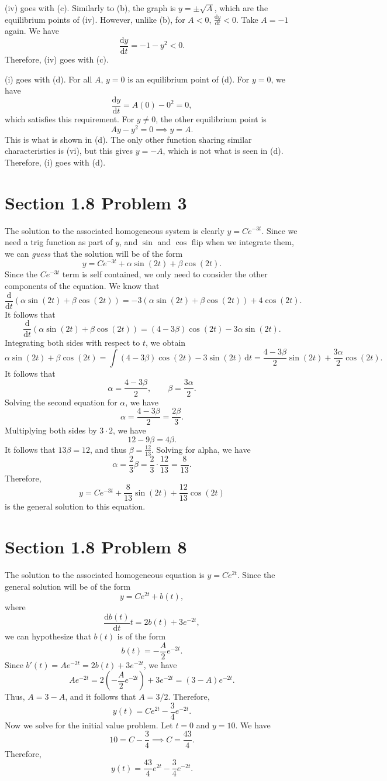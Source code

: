 \documentclass[11pt, letterpaper]{report}
\begin{document}
(iv) goes with (c). Similarly to (b), the graph is $y=\pm \sqrt{A} $, which are the equilibrium points of (iv). However, unlike (b), for $A<0$, $\frac{\mathrm{d}y}{\mathrm{d}t} <0$. Take $A=-1$ again. We have
\[
	\frac{\mathrm{d}y}{\mathrm{d}t} =-1-y^2<0
.\]
Therefore, (iv) goes with (c).

(i) goes with (d). For all $A$, $y=0$ is an equilibrium point of (d). For $y=0$, we have
\[
	\frac{\mathrm{d}y}{\mathrm{d}t} =A(0)-0^2=0
,\]
which satisfies this requirement. For $y\neq 0$, the other equilibrium point is
\[
	Ay-y^2=0 \implies y=A
.\]
This is what is shown in (d). The only other function sharing similar characteristics is (vi), but this gives $y=-A$, which is not what is seen in (d). Therefore, (i) goes with (d).

\section*{Section 1.8 Problem 3}
The solution to the associated homogeneous system is clearly $y=Ce^{-3t}$. Since we need a trig function as part of $y$, and $\sin $ and $\cos $ flip when we integrate them, we can \emph{guess} that the solution will be of the form
\[
	y=Ce^{-3t}+\alpha \sin (2t)+\beta \cos (2t)
.\]
Since the $Ce^{-3t}$ term is self contained, we only need to consider the other components of the equation. We know that
\[
\frac{\mathrm{d}}{\mathrm{d}t} \left( \alpha \sin (2t)+\beta \cos (2t) \right) =-3\left( \alpha \sin (2t)+\beta \cos (2t) \right) +4\cos (2t)
.\]
It follows that
\[
	\frac{\mathrm{d}}{\mathrm{d}t} \left( \alpha \sin (2t)+\beta \cos (2t) \right) =(4-3\beta )\cos (2t)-3\alpha \sin (2t)
.\]
Integrating both sides with respect to $t$, we obtain
\[
	\alpha \sin (2t)+\beta \cos (2t)=\int \left( 4-3\beta  \right) \cos (2t)-3\sin (2t) \,\mathrm{d} t=\frac{4-3\beta }{2}\sin  (2t)+\frac{3\alpha }{2}\cos  (2t)
.\]
It follows that
\[
	\alpha =\frac{4-3\beta }{2},\qquad \beta =\frac{3\alpha }{2}
.\]
Solving the second equation for $\alpha $, we have
\[
	\alpha =\frac{4-3\beta }{2}=\frac{2\beta }{3}
.\]
Multiplying both sides by $3\cdot 2$, we have
\[
	12-9\beta =4\beta 
.\]
It follows that $13\beta =12$, and thus $\beta =\frac{12}{13}$. Solving for alpha, we have
\[
	\alpha =\frac{2}{3}\beta =\frac{2}{3}\cdot \frac{12}{13}=\frac{8}{13}
.\]
Therefore,
\[
	y=Ce^{-3t}+\frac{8}{13}\sin (2t)+\frac{12}{13}\cos (2t)
\]
is the general solution to this equation.
\section*{Section 1.8 Problem 8}
The solution to the associated homogeneous equation is $y=Ce^{2t}$. Since the general solution will be of the form
\[
	y=Ce^{2t}+b(t)
,\]
where
\[
	\frac{\mathrm{d}b(t)}{\mathrm{d}t}  t=2b(t)+3e^{-2t}	
,\]
we can hypothesize that $b(t)$ is of the form
\[
	b(t)=-\frac{A}{2}e^{-2t}
.\]
Since $b'(t)=Ae^{-2t}=2b(t)+3e^{-2t}$, we have
\[
	Ae^{-2t}=2\left( -\frac{A}{2}e^{-2t} \right) +3e^{-2t}=\left( 3-A \right) e^{-2t}
.\]
Thus, $A=3-A$, and it follows that $A=3/2$. Therefore,
\[
	y(t)=Ce^{2t}-\frac{3}{4}e^{-2t}
.\]
Now we solve for the initial value problem. Let $t=0$ and $y=10$. We have
\[
	10=C-\frac{3}{4}\implies C=\frac{43}{4}
.\]
Therefore,
\[
	y(t)=\frac{43}{4}e^{2t}-\frac{3}{4}e^{-2t}
.\]
\end{document}
